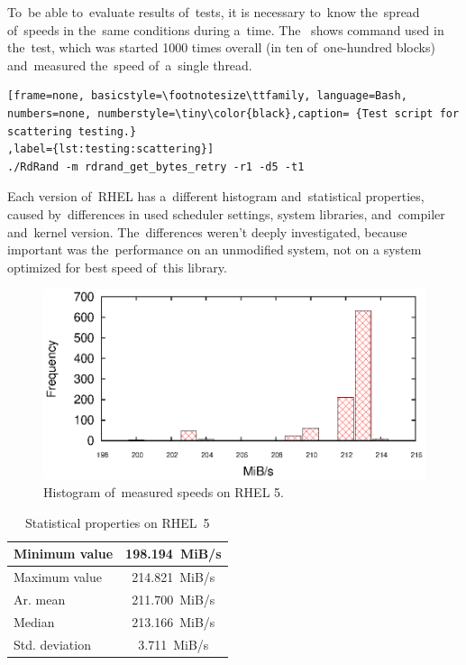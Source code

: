 \par{
To~be able to~evaluate results of~tests, it is necessary to~know the~spread of~speeds in the~same conditions during a~time. The~ shows command used in the~test, which was started 1000 times overall (in ten of~one-hundred blocks) and~measured the~speed of~a~single thread.
}

\begin{lstlisting}[frame=none, basicstyle=\footnotesize\ttfamily, language=Bash, numbers=none, numberstyle=\tiny\color{black},caption= {Test script for scattering testing.}
,label={lst:testing:scattering}]
./RdRand -m rdrand_get_bytes_retry -r1 -d5 -t1 
\end{lstlisting}

\par{
Each version of~RHEL has a~different histogram and~statistical properties, caused by~differences in used scheduler settings, system libraries, and~compiler and~kernel version. The~differences weren't deeply investigated, because important was the~performance on an unmodified system, not on a system optimized for best speed of~this library.
}

\begin{figure}[h!]
  \centering
 \includegraphics[width=12cm]{fig/tests/scattering_rhel5.eps} %
\caption{Histogram of~measured speeds on RHEL 5.}
\label{fig:testing:stability-r5}
\end{figure}

\begin{table}[h!]
\begin{center}
\begin{tabular}{|l|c|}
  \hline
  Minimum value& 198.194~MiB/s\\
  \hline
  Maximum value& 214.821~MiB/s\\ 
  \hline
  Ar. mean & 211.700~MiB/s\\
  \hline
  Median & 213.166~MiB/s\\
  \hline
  Std. deviation & 3.711~MiB/s\\
  \hline
\end{tabular}
\caption{Statistical properties on RHEL~5}
\label{tab:testing:stability-stat-r5}
\end{center}
\end{table}

